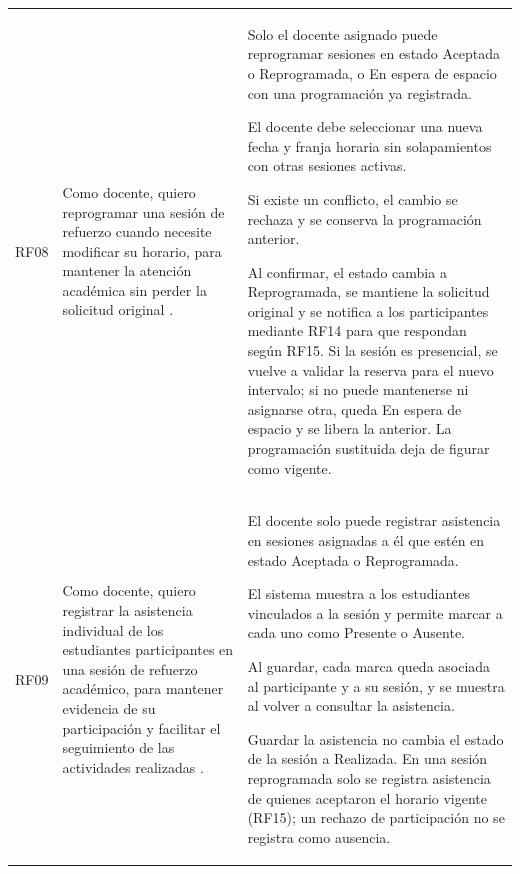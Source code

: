 \begin{longtable}{@{}p{}p{}p{}@{}}
RF08 &
Como docente, quiero reprogramar una sesión de refuerzo
cuando necesite modificar su horario, para mantener
la atención académica sin perder la solicitud original \cite{Daz2025}. &
Solo el docente asignado puede reprogramar sesiones en estado
Aceptada o Reprogramada, o En espera de espacio con una
programación ya registrada.
\par\smallskip\noindent
El docente debe seleccionar una nueva fecha y franja
horaria sin solapamientos con otras sesiones activas.
\par\smallskip\noindent
Si existe un conflicto, el cambio se rechaza y se
conserva la programación anterior.
\par\smallskip\noindent
Al confirmar, el estado cambia a Reprogramada, se
mantiene la solicitud original y se notifica a los
participantes mediante RF14 para que respondan según RF15.
Si la sesión es presencial, se vuelve a validar la reserva
para el nuevo intervalo; si no puede mantenerse ni asignarse
otra, queda En espera de espacio y se libera la anterior.
La programación sustituida deja de figurar como vigente. \\

RF09 &
Como docente, quiero registrar la asistencia individual
de los estudiantes participantes en una sesión de refuerzo
académico, para mantener evidencia de su participación y
facilitar el seguimiento de las actividades realizadas \cite{Daz2025}. &
El docente solo puede registrar asistencia en sesiones
asignadas a él que estén en estado Aceptada o Reprogramada.
\par\smallskip\noindent
El sistema muestra a los estudiantes vinculados a la sesión
y permite marcar a cada uno como Presente o Ausente.
\par\smallskip\noindent
Al guardar, cada marca queda asociada al participante y a
su sesión, y se muestra al volver a consultar la asistencia.
\par\smallskip\noindent
Guardar la asistencia no cambia el estado de la sesión a
Realizada. En una sesión reprogramada solo se registra
asistencia de quienes aceptaron el horario vigente (RF15);
un rechazo de participación no se registra como ausencia. \\


\end{longtable}
